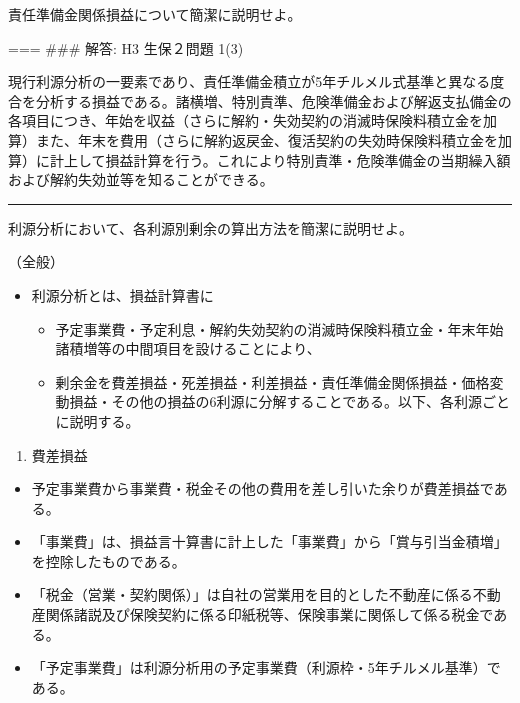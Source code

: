 \documentclass[report,gutter=10mm,fore-edge=10mm,uplatex,dvipdfmx]{jlreq}
\begin{document}
責任準備金関係損益について簡潔に説明せよ。

=== \#\#\# 解答: H3 生保２問題 1(3)

現行利源分析の一要素であり、責任準備金積立が5年チルメル式基準と異なる度合を分析する損益である。諸横増、特別責準、危険準備金および解返支払備金の各項目につき、年始を収益（さらに解約・失効契約の消滅時保険料積立金を加算）また、年末を費用（さらに解約返戻金、復活契約の失効時保険料積立金を加算）に計上して損益計算を行う。これにより特別責準・危険準備金の当期繰入額および解約失効並等を知ることができる。

\begin{center}\rule{0.5\linewidth}{0.5pt}\end{center}


利源分析において、各利源別剰余の算出方法を簡潔に説明せよ。


（全般）

\begin{itemize}
\tightlist
\item
  利源分析とは、損益計算書に

  \begin{itemize}
  \tightlist
  \item
    予定事業費・予定利息・解約失効契約の消滅時保険料積立金・年末年始諸積増等の中間項目を設けることにより、
  \item
    剰余金を費差損益・死差損益・利差損益・責任準備金関係損益・価格変動損益・その他の損益の6利源に分解することである。以下、各利源ごとに説明する。
  \end{itemize}
\end{itemize}

\begin{enumerate}
\tightlist
\item
  費差損益
\end{enumerate}

\begin{itemize}
\tightlist
\item
  予定事業費から事業費・税金その他の費用を差し引いた余りが費差損益である。
\item
  「事業費」は、損益言十算書に計上した「事業費」から「賞与引当金積増」を控除したものである。
\item
  「税金（営業・契約関係）」は自社の営業用を目的とした不動産に係る不動産関係諸説及ぴ保険契約に係る印紙税等、保険事業に関係して係る税金である。
\item
  「予定事業費」は利源分析用の予定事業費（利源枠・5年チルメル基準）である。
\end{itemize}
\end{document}
